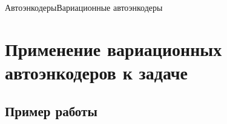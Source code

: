 \documentclass{beamer}
\begin{document}
\begin{frame}{Автоэнкодеры}{Вариационные автоэнкодеры}

\begin{figure}[h]
\label{fig:vae}
\end{figure}

\end{frame}

\section{Применение вариационных автоэнкодеров к задаче}

\subsection{Пример работы}
\end{document}
